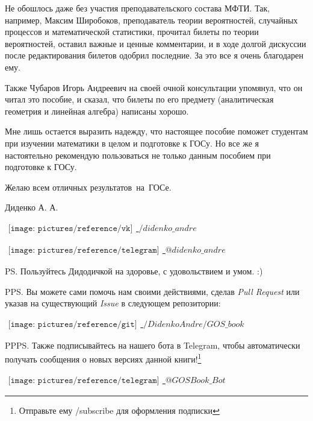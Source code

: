 Не обошлось даже без участия преподавательского состава МФТИ. Так, например, Максим Широбоков, преподаватель теории вероятностей, случайных процессов и математической статистики, прочитал билеты по теории вероятностей, оставил важные и ценные комментарии, и в ходе долгой дискуссии после редактирования билетов одобрил последние. За это все я очень благодарен ему.

Также Чубаров Игорь Андреевич на своей очной консультации упомянул, что он читал это пособие, и сказал, что билеты по его предмету (аналитическая геометрия и линейная алгебра) написаны хорошо.
 
Мне лишь остается выразить надежду, что настоящее пособие поможет студентам при изучении математики в целом и подготовке к ГОСу. Но все же я настоятельно рекомендую пользоваться не только данным пособием при подготовке к ГОСу.
\vspace*{\baselineskip}

\mbox{}

Желаю всем отличных результатов~на~ГОСе.

\mbox{}

\noindent Диденко А. А.

\vspace*{0.5\baselineskip} 

\noindent\href{https://vk.com/didenko_andre}{$
	\begin{array}{l}
	\texttt{[image: pictures/reference/vk]}
	\end{array}
	$ $/didenko\_andre$}

\noindent\href{https://telegram.me/didenko_andre}{$
	\begin{array}{l}
	\texttt{[image: pictures/reference/telegram]}
	\end{array}
	$ $@didenko\_andre$}

\mbox{}

\noindent PS. Пользуйтесь Дидодичкой на здоровье, с удовольствием и умом. :)

\mbox{}

\noindent PPS. Вы можете сами помочь нам своими действиями, сделав \textit{Pull Request} или указав на существующий \textit{Issue} в следующем репозитории:
\vspace*{0.5\baselineskip} 

\noindent\href{https://github.com/DidenkoAndre/GOS_book}{$
	\begin{array}{l}
	\texttt{[image: pictures/reference/git]}
	\end{array}
	$ $/DidenkoAndre/GOS\_book$}

\mbox{}

\noindent PPPS. Также подписывайтесь на нашего бота в \textsf{Telegram}, чтобы автоматически получать сообщения о новых версиях данной книги!\footnote{Отправьте ему \textsf{/subscribe} для оформления подписки}
\vspace*{0.5\baselineskip} 

\noindent\href{https://t.me/GOSBook_Bot}{$
	\begin{array}{l}
	\texttt{[image: pictures/reference/telegram]}
	\end{array}
	$ $@GOSBook\_Bot$}
